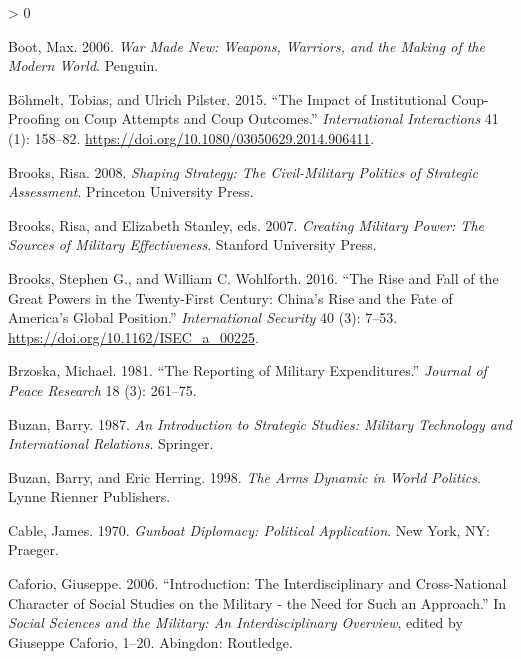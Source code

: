 \documentclass[
]{article}
\newlength{\cslhangindent}
\newenvironment{CSLReferences}[2] %
 {%
  \setlength{\parindent}{0pt}
  \ifodd #1 \everypar{\setlength{\hangindent}{\cslhangindent}}\ignorespaces\fi
  \ifnum #2 > 0
  \setlength{\parskip}{#2\baselineskip}
  \fi
 }%
 {}
\begin{document}
\begin{CSLReferences}{1}{0}
\leavevmode\hypertarget{ref-boot_warmadenew_2006}{}%
Boot, Max. 2006. \emph{War {Made New}: {Weapons}, {Warriors}, and the {Making} of the {Modern World}}. {Penguin}.

\leavevmode\hypertarget{ref-bohmelt_impactinstitutionalcoupproofing_2015}{}%
Böhmelt, Tobias, and Ulrich Pilster. 2015. {``The {Impact} of {Institutional Coup}-{Proofing} on {Coup Attempts} and {Coup Outcomes}.''} \emph{International Interactions} 41 (1): 158--82. \url{https://doi.org/10.1080/03050629.2014.906411}.

\leavevmode\hypertarget{ref-brooks_shapingstrategycivilmilitary_2008}{}%
Brooks, Risa. 2008. \emph{Shaping {Strategy}: {The Civil}-Military {Politics} of {Strategic Assessment}}. {Princeton University Press}.

\leavevmode\hypertarget{ref-brooks_creatingmilitarypower_2007}{}%
Brooks, Risa, and Elizabeth Stanley, eds. 2007. \emph{Creating {Military Power}: {The Sources} of {Military Effectiveness}}. {Stanford University Press}.

\leavevmode\hypertarget{ref-brooks_risefallgreat_2016}{}%
Brooks, Stephen G., and William C. Wohlforth. 2016. {``The {Rise} and {Fall} of the {Great Powers} in the {Twenty}-First {Century}: {China}'s {Rise} and the {Fate} of {America}'s {Global Position}.''} \emph{International Security} 40 (3): 7--53. \url{https://doi.org/10.1162/ISEC_a_00225}.

\leavevmode\hypertarget{ref-brzoska_reportingmilitaryexpenditures_1981}{}%
Brzoska, Michael. 1981. {``The Reporting of Military Expenditures.''} \emph{Journal of Peace Research} 18 (3): 261--75.

\leavevmode\hypertarget{ref-buzan_introductionstrategicstudies_1987}{}%
Buzan, Barry. 1987. \emph{An {Introduction} to {Strategic Studies}: {Military Technology} and {International Relations}}. {Springer}.

\leavevmode\hypertarget{ref-buzan_armsdynamicworld_1998}{}%
Buzan, Barry, and Eric Herring. 1998. \emph{The {Arms Dynamic} in {World Politics}}. {Lynne Rienner Publishers}.

\leavevmode\hypertarget{ref-cable_gunboatdiplomacypolitical_1970}{}%
Cable, James. 1970. \emph{Gunboat {Diplomacy}: {Political Application}}. {New York, NY}: {Praeger}.

\leavevmode\hypertarget{ref-caforio_introductioninterdisciplinarycrossnational_2006}{}%
Caforio, Giuseppe. 2006. {``Introduction: The Interdisciplinary and Cross-National Character of Social Studies on the Military - the Need for Such an Approach.''} In \emph{Social {Sciences} and the {Military}: {An Interdisciplinary Overview}}, edited by Giuseppe Caforio, 1--20. {Abingdon}: {Routledge}.


\end{CSLReferences}
\end{document}
